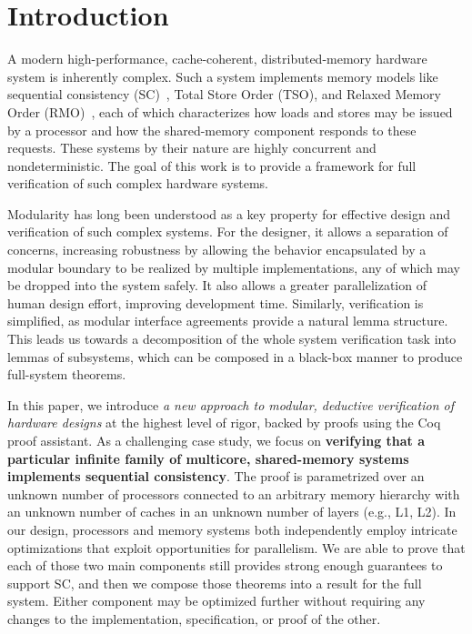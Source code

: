  \section{Introduction}
\label{sec:Introduction}

A modern high-performance, cache-coherent, distributed-memory hardware system
is inherently complex. Such a system implements memory models like sequential
consistency (SC)~\cite{lamport1979make}, Total Store Order (TSO), and Relaxed
Memory Order (RMO)~\cite{weaver1994sparc}, each of which characterizes how
loads and stores may be issued by a processor and how the shared-memory
component responds to these requests.  These systems by their nature are highly
concurrent and nondeterministic.  The goal of this work is to provide a
framework for full verification of such complex hardware systems.  

Modularity has long been understood as a key property for effective design and
verification of such complex systems. For the designer, it allows a separation
of concerns, increasing robustness by allowing the behavior encapsulated by a
modular boundary to be realized by multiple implementations, any of which may
be dropped into the system safely. It also allows a greater parallelization of
human design effort, improving development time. Similarly, verification is
simplified, as modular interface agreements provide a natural lemma structure.
This leads us towards a decomposition of the whole system verification task
into lemmas of subsystems, which can be composed in a black-box manner to
produce full-system theorems.

In this paper, we introduce \emph{a new approach to modular, deductive
verification of hardware designs} at the highest level of rigor, backed by
proofs using the Coq proof assistant.  As a challenging case study, we focus on
\textbf{verifying that a particular infinite family of multicore, shared-memory
systems implements sequential consistency}.  The proof is parametrized over an
unknown number of processors connected to an arbitrary memory hierarchy with an
unknown number of caches in an unknown number of layers (e.g., L1, L2).  In our
design, processors and memory systems both independently employ intricate
optimizations that exploit opportunities for parallelism.  We are able to prove
that each of those two main components still provides strong enough guarantees
to support SC, and then we compose those theorems into a result for the full
system.  Either component may be optimized further without requiring any
changes to the implementation, specification, or proof of the other.

